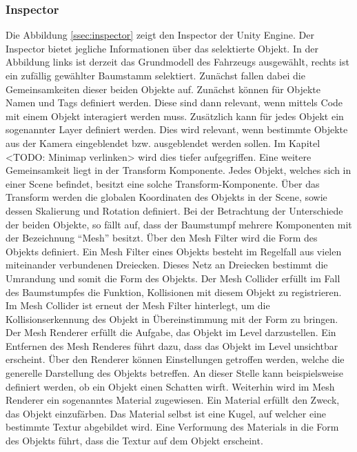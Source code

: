 \subsubsection{Inspector}
Die Abbildung \ref{ssec:inspector} zeigt den Inspector der Unity Engine. Der Inspector bietet jegliche Informationen über das selektierte Objekt. In der Abbildung links ist derzeit das Grundmodell des Fahrzeugs ausgewählt, rechts ist ein zufällig gewählter Baumstamm selektiert.
Zunächst fallen dabei die Gemeinsamkeiten dieser beiden Objekte auf. Zunächst können für Objekte Namen und Tags definiert werden. Diese sind dann relevant, wenn mittels Code mit einem Objekt interagiert werden muss. Zusätzlich kann für jedes Objekt ein sogenannter Layer definiert werden. Dies wird relevant, wenn bestimmte Objekte aus der Kamera eingeblendet bzw. ausgeblendet werden sollen. Im Kapitel <TODO: Minimap verlinken> wird dies tiefer aufgegriffen. Eine weitere Gemeinsamkeit liegt in der Transform Komponente. Jedes Objekt, welches sich in einer Scene befindet, besitzt eine solche Transform-Komponente. Über das Transform werden die globalen Koordinaten des Objekts in der Scene, sowie dessen Skalierung und Rotation definiert.
Bei der Betrachtung der Unterschiede der beiden Objekte, so fällt auf, dass der Baumstumpf mehrere Komponenten mit der Bezeichnung \enquote{Mesh} besitzt.
Über den Mesh Filter wird die Form des Objekts definiert. Ein Mesh Filter eines Objekts besteht im Regelfall aus vielen miteinander verbundenen Dreiecken. Dieses Netz an Dreiecken bestimmt die Umrandung und somit die Form des Objekts.
Der Mesh Collider erfüllt im Fall des Baumstumpfes die Funktion, Kollisionen mit diesem Objekt zu registrieren. Im Mesh Collider ist erneut der Mesh Filter hinterlegt, um die Kollisionserkennung des Objekt in Übereinstimmung mit der Form zu bringen.
Der Mesh Renderer erfüllt die Aufgabe, das Objekt im Level darzustellen. Ein Entfernen des Mesh Renderes führt dazu, dass das Objekt im Level unsichtbar erscheint. Über den Renderer können Einstellungen getroffen werden, welche die generelle Darstellung des Objekts betreffen. An dieser Stelle kann beispielsweise definiert werden, ob ein Objekt einen Schatten wirft. Weiterhin wird im Mesh Renderer ein sogenanntes Material zugewiesen. Ein Material erfüllt den Zweck, das Objekt einzufärben. Das Material selbst ist eine Kugel, auf welcher eine bestimmte Textur abgebildet wird. Eine Verformung des Materials in die Form des Objekts führt, dass die Textur auf dem Objekt erscheint.
